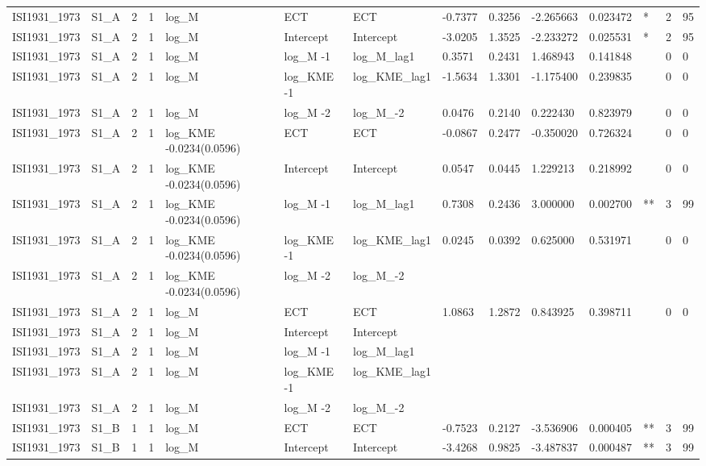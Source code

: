 \begin{tabular}{llllllllllllll}
ISI1931\_1973 & S1\_A & 2 & 1 & log\_M & ECT & ECT & -0.7377 & 0.3256 & -2.265663 & 0.023472 & * & 2 & 95 \\
ISI1931\_1973 & S1\_A & 2 & 1 & log\_M & Intercept & Intercept & -3.0205 & 1.3525 & -2.233272 & 0.025531 & * & 2 & 95 \\
ISI1931\_1973 & S1\_A & 2 & 1 & log\_M & log\_M -1 & log\_M\_lag1 & 0.3571 & 0.2431 & 1.468943 & 0.141848 &  & 0 & 0 \\
ISI1931\_1973 & S1\_A & 2 & 1 & log\_M & log\_KME -1 & log\_KME\_lag1 & -1.5634 & 1.3301 & -1.175400 & 0.239835 &  & 0 & 0 \\
ISI1931\_1973 & S1\_A & 2 & 1 & log\_M & log\_M -2 & log\_M\_-2 & 0.0476 & 0.2140 & 0.222430 & 0.823979 &  & 0 & 0 \\
ISI1931\_1973 & S1\_A & 2 & 1 & log\_KME -0.0234(0.0596) & ECT & ECT & -0.0867 & 0.2477 & -0.350020 & 0.726324 &  & 0 & 0 \\
ISI1931\_1973 & S1\_A & 2 & 1 & log\_KME -0.0234(0.0596) & Intercept & Intercept & 0.0547 & 0.0445 & 1.229213 & 0.218992 &  & 0 & 0 \\
ISI1931\_1973 & S1\_A & 2 & 1 & log\_KME -0.0234(0.0596) & log\_M -1 & log\_M\_lag1 & 0.7308 & 0.2436 & 3.000000 & 0.002700 & ** & 3 & 99 \\
ISI1931\_1973 & S1\_A & 2 & 1 & log\_KME -0.0234(0.0596) & log\_KME -1 & log\_KME\_lag1 & 0.0245 & 0.0392 & 0.625000 & 0.531971 &  & 0 & 0 \\
ISI1931\_1973 & S1\_A & 2 & 1 & log\_KME -0.0234(0.0596) & log\_M -2 & log\_M\_-2 &  &  &  &  &  &  &  \\
ISI1931\_1973 & S1\_A & 2 & 1 & log\_M & ECT & ECT & 1.0863 & 1.2872 & 0.843925 & 0.398711 &  & 0 & 0 \\
ISI1931\_1973 & S1\_A & 2 & 1 & log\_M & Intercept & Intercept &  &  &  &  &  &  &  \\
ISI1931\_1973 & S1\_A & 2 & 1 & log\_M & log\_M -1 & log\_M\_lag1 &  &  &  &  &  &  &  \\
ISI1931\_1973 & S1\_A & 2 & 1 & log\_M & log\_KME -1 & log\_KME\_lag1 &  &  &  &  &  &  &  \\
ISI1931\_1973 & S1\_A & 2 & 1 & log\_M & log\_M -2 & log\_M\_-2 &  &  &  &  &  &  &  \\
ISI1931\_1973 & S1\_B & 1 & 1 & log\_M & ECT & ECT & -0.7523 & 0.2127 & -3.536906 & 0.000405 & ** & 3 & 99 \\
ISI1931\_1973 & S1\_B & 1 & 1 & log\_M & Intercept & Intercept & -3.4268 & 0.9825 & -3.487837 & 0.000487 & ** & 3 & 99 \\

\end{tabular}
